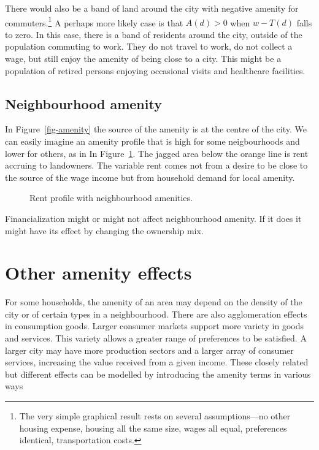 There would also be a band of land around the city with negative amenity for commuters.\footnote{The very simple graphical result rests on several assumptions---no other housing expense, housing all the same size, wages all equal, preferences identical, transportation costs.} A perhaps more likely case is that $A(d) > 0$ when $w-T(d)$ falls to zero. In this case, there is a band of residents around the city, outside of the population commuting to work. They do not travel to work, do not collect a wage, but still enjoy the amenity of being close to a city. This might be a population of retired persons enjoying occasional visits and healthcare facilities.

\subsection{Neighbourhood amenity}
In Figure~\ref{fig-amenity} the source of the amenity is at the centre of the city. We can easily imagine an amenity profile that is high for some neigbourhoods and lower for others, as in  In Figure~\ref{fig-amenity2}. The jagged area below the orange line is rent accruing to landowners. The variable rent comes not from a desire to be close to the source of the wage income but from household demand for local amenity.  
\begin{figure}[tb]
\begin{center}

\end{center}
\caption[Rent profile with neighbourhood amenities]{Rent profile with neighbourhood amenities.}
\label{fig-amenity2}
\end{figure}
Financialization might or might not affect neighbourhood amenity. If it does it might have its effect by changing the ownership mix.

\section{Other amenity effects}
For some households, the amenity of an area may depend on the density of the city or of certain types in a neighbourhood. %
There are also agglomeration effects in consumption goods. Larger consumer markets support more variety in goods and services. This variety allows a greater range of preferences to be satisfied. A larger city may have more production sectors and a larger array of consumer services, increasing the value received from a given income.  These closely related but different effects can be modelled by introducing the amenity terms in various ways 


